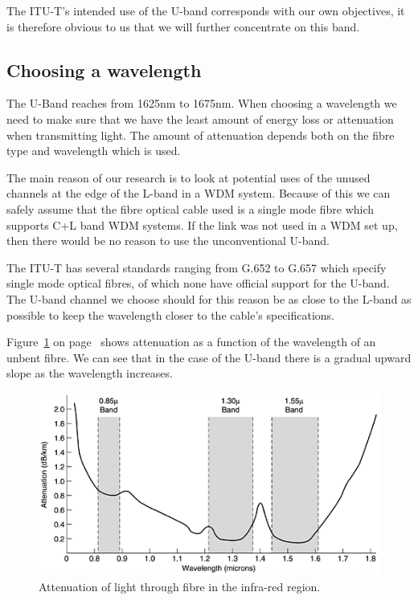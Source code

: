 \documentclass{article}
\begin{document}
The ITU-T's intended use of the U-band corresponds with our own objectives, it is therefore obvious to us that we will further concentrate on this band.

\subsection{Choosing a wavelength}
The U-Band reaches from 1625nm to 1675nm. When choosing a wavelength we need to make sure that we have the least amount of energy loss or attenuation when transmitting light.
The amount of attenuation depends both on the fibre type and wavelength which is used. 

The main reason of our research is to look at potential uses of the unused channels at the edge of the L-band in a WDM system.
Because of this we can safely assume that the fibre optical cable used is a single mode fibre which supports C+L band WDM systems.
If the link was not used in a WDM set up, then there would be no reason to use the unconventional U-band.

The ITU-T has several standards ranging from G.652 to G.657 which specify single mode optical fibres\cite[chap. 6-7]{itu-t:manual2009}, of which none have official support for the U-band.
The U-band channel we choose should for this reason be as close to the L-band as possible to keep the wavelength closer to the cable's specifications.

Figure~\ref{fig:attenuation} on page~\pageref{fig:attenuation} shows attenuation as a function of the wavelength of an unbent fibre. We can see that in the case of the U-band there is a gradual upward slope as the wavelength increases.
\begin{figure}[h]
\centerline{\includegraphics[scale=0.5, trim = 0mm 0mm 0mm 0mm]{images/attenuation.png}}
\caption{Attenuation of light through fibre in the infra-red region.\cite[fig 2-6]{tannenbaum:networks}}
\label{fig:attenuation}
\end{figure}
\end{document}
